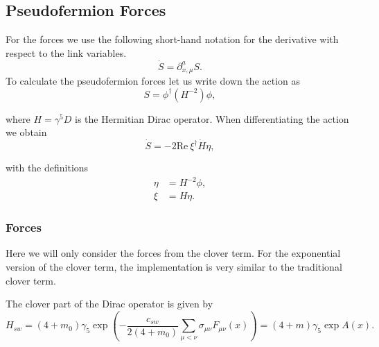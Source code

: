 \documentclass[12pt]{article}
\newcommand{\re}{\mathrm{Re}}
\begin{document}
\subsection*{Pseudofermion Forces}
For the forces we use the following short-hand notation for the derivative with respect to the link variables.
\begin{equation}
 \dot{S} = \partial_{x,\mu}^a S.
\end{equation}
To calculate the pseudofermion forces let us write down the action as
\begin{equation}
 S = \phi^\dagger(H^{-2})\phi,
\end{equation}

where $H=\gamma^5D$ is the Hermitian Dirac operator. When differentiating the action we obtain
\begin{equation}
 \dot{S} = -2\re~\xi^\dagger\dot{H}\eta,
 \label{eq:dotS}
\end{equation}

with the definitions
\begin{align}
 \eta &= H^{-2}\phi, \\
 \xi &= H\eta.
\end{align}

\subsubsection*{Forces}
Here we will only consider the forces from the clover term. For the exponential version of the clover term, the implementation is very similar to the traditional clover term.

The clover part of the Dirac operator is given by
\begin{equation}
 H_{sw} = (4+m_0) \gamma_5 \exp \left(- \frac{c_{sw}}{2(4+m_0)}  \sum_{\mu<\nu}{\sigma}_{\mu\nu}F_{\mu\nu}(x)  \right) = (4+m) \gamma_5 \exp A(x).
 \label{eq:Hsw}
\end{equation}
\end{document}
